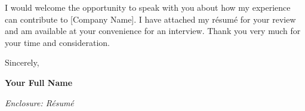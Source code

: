 I would welcome the opportunity to speak with you about how my experience can
contribute to [Company Name]. I have attached my résumé for your review and
am available at your convenience for an interview. Thank you very much for
your time and consideration.

\bigskip


Sincerely,

\vspace{32pt}

\textbf{Your Full Name}

\medskip

\textit{Enclosure: Résumé}


